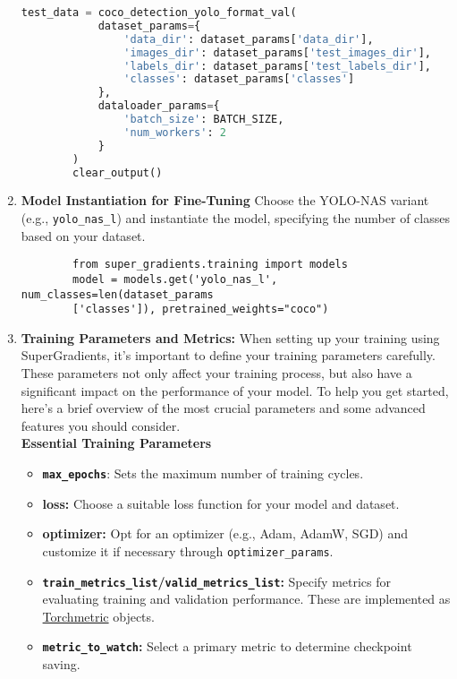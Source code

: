 \begin{enumerate}
\begin{lstlisting}[language=Python, caption=Setting-Up Dataloaders]
        test_data = coco_detection_yolo_format_val(
            dataset_params={
                'data_dir': dataset_params['data_dir'],
                'images_dir': dataset_params['test_images_dir'],
                'labels_dir': dataset_params['test_labels_dir'],
                'classes': dataset_params['classes']
            },
            dataloader_params={
                'batch_size': BATCH_SIZE,
                'num_workers': 2
            }
        )
        clear_output()
     \end{lstlisting}
     \item \textbf{Model Instantiation for Fine-Tuning}
     Choose the YOLO-NAS variant (e.g., \texttt{yolo\_nas\_l}) and instantiate the model, specifying the number of classes based on your dataset.
     \begin{lstlisting}
        from super_gradients.training import models
        model = models.get('yolo_nas_l', num_classes=len(dataset_params
        ['classes']), pretrained_weights="coco")
     \end{lstlisting}
    \item \textbf{Training Parameters and Metrics: } When setting up your training using SuperGradients, it's important to define your training parameters carefully. These parameters not only affect your training process, but also have a significant impact on the performance of your model. To help you get started, here's a brief overview of the most crucial parameters and some advanced features you should consider. \\
    
    \textbf{Essential Training Parameters}\\
    \begin{itemize}
        \item \textbf{\texttt{max\_epochs}}: Sets the maximum number of training cycles. \\
        \item \textbf{loss: } Choose a suitable loss function for your model and dataset. \\
        \item \textbf{optimizer: } Opt for an optimizer (e.g., Adam, AdamW, SGD) and customize it if necessary through \texttt{optimizer\_params}.\\
        \item \textbf{\texttt{train\_metrics\_list}/\texttt{valid\_metrics\_list}: } Specify metrics for evaluating training and validation performance. These are implemented as \href{https://lightning.ai/docs/torchmetrics/stable/}{Torchmetric} objects. \\
        \item \textbf{\texttt{metric\_to\_watch}: } Select a primary metric to determine checkpoint saving. \\
    \end{itemize} 
    

\end{enumerate}
